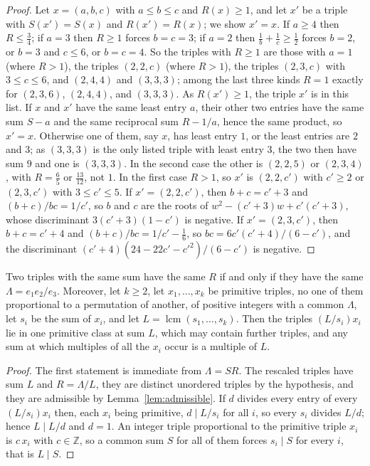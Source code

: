 \documentclass[10pt]{article}
\newcommand{\Z}{\mathbb{Z}}
\begin{document}
\begin{proof}
Let $x=(a,b,c)$ with $a\le b\le c$ and $R(x)\ge1$, and let $x'$ be a triple with $S(x')=S(x)$ and $R(x')=R(x)$; we show $x'=x$. If $a\ge4$ then $R\le\frac34$; if $a=3$ then $R\ge1$ forces $b=c=3$; if $a=2$ then $\frac1b+\frac1c\ge\frac12$ forces $b=2$, or $b=3$ and $c\le6$, or $b=c=4$. So the triples with $R\ge1$ are those with $a=1$ (where $R>1$), the triples $(2,2,c)$ (where $R>1$), the triples $(2,3,c)$ with $3\le c\le6$, and $(2,4,4)$ and $(3,3,3)$; among the last three kinds $R=1$ exactly for $(2,3,6)$, $(2,4,4)$, and $(3,3,3)$. As $R(x')\ge1$, the triple $x'$ is in this list. If $x$ and $x'$ have the same least entry $a$, their other two entries have the same sum $S-a$ and the same reciprocal sum $R-1/a$, hence the same product, so $x'=x$. Otherwise one of them, say $x$, has least entry $1$, or the least entries are $2$ and $3$; as $(3,3,3)$ is the only listed triple with least entry $3$, the two then have sum $9$ and one is $(3,3,3)$. In the second case the other is $(2,2,5)$ or $(2,3,4)$, with $R=\frac65$ or $\frac{13}{12}$, not $1$. In the first case $R>1$, so $x'$ is $(2,2,c')$ with $c'\ge2$ or $(2,3,c')$ with $3\le c'\le5$. If $x'=(2,2,c')$, then $b+c=c'+3$ and $(b+c)/bc=1/c'$, so $b$ and $c$ are the roots of $w^2-(c'+3)w+c'(c'+3)$, whose discriminant $3(c'+3)(1-c')$ is negative. If $x'=(2,3,c')$, then $b+c=c'+4$ and $(b+c)/bc=1/c'-\frac16$, so $bc=6c'(c'+4)/(6-c')$, and the discriminant $(c'+4)(24-22c'-c'^2)/(6-c')$ is negative.
\end{proof}

\begin{proposition}\label{prop:reformulation}
Two triples with the same sum have the same $R$ if and only if they have the same $\Lambda=e_1e_2/e_3$. Moreover, let $k\ge2$, let $x_1,\dots,x_k$ be primitive triples, no one of them proportional to a permutation of another, of positive integers with a common $\Lambda$, let $s_i$ be the sum of $x_i$, and let $L=\operatorname{lcm}(s_1,\dots,s_k)$. Then the triples $(L/s_i)x_i$ lie in one primitive class at sum $L$, which may contain further triples, and any sum at which multiples of all the $x_i$ occur is a multiple of $L$.
\end{proposition}

\begin{proof}
The first statement is immediate from $\Lambda=SR$. The rescaled triples have sum $L$ and $R=\Lambda/L$, they are distinct unordered triples by the hypothesis, and they are admissible by Lemma~\ref{lem:admissible}. If $d$ divides every entry of every $(L/s_i)x_i$ then, each $x_i$ being primitive, $d\mid L/s_i$ for all $i$, so every $s_i$ divides $L/d$; hence $L\mid L/d$ and $d=1$. An integer triple proportional to the primitive triple $x_i$ is $c\,x_i$ with $c\in\Z$, so a common sum $S$ for all of them forces $s_i\mid S$ for every $i$, that is $L\mid S$.
\end{proof}
\end{document}
